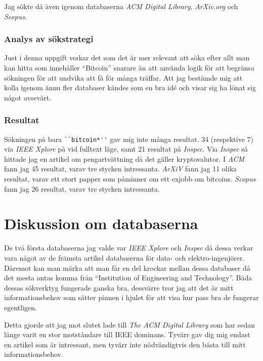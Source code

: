 \documentclass[a4paper,11pt,exjobb]{kth-mag}
\begin{document}
Jag sökte då även igenom databaserna \textit{ACM Digital Library}, \textit{ArXiv.org} och \textit{Scopus}\cite{scopus}.

\subsubsection{Analys av sökstrategi}
Just i denna uppgift verkar det som det är mer relevant att söka efter allt man kan hitta som innehåller ``Bitcoin'' snarare än att använda logik för att begränsa sökningen för att undvika att få för många träffar. Att jag bestämde mig att kolla igenom ännu fler databaser kändes som en bra idé och visar sig ha lönat sig något avsevärt.

\subsubsection{Resultat}
Sökningen på bara \verb#``bitcoin*''# gav mig inte många resultat. 34 (respektive 7) via \textit{IEEE Xplore} på vid fulltext läge, samt 21 resultat på \textit{Inspec}. 
Via \textit{Inspec} så hittade jag en artikel om pengartvättning då det gäller kryptovalutor\cite{Stokes}.
I \textit{ACM} fann jag 45 resultat, varav tre stycken intressanta\cite{Christ, Martins}.
\textit{ArXiV} fann jag 11 olika resultat, varav ett stort papper som påminner om ett exjobb om bitcoins\cite{bitsc}. 
\textit{Scopus} fann jag 26 resultat, varav tre stycken intressanta\cite{scoop1, scoop2, scoop3}.

\section{Diskussion om databaserna}
\label{sec:whydata}
De två första databaserna jag valde var \textit{IEEE Xplore} och \textit{Inspec} då dessa verkar vara något av de främsta artikel databaserna för data- och elektro-ingenjörer. Däremot kan man märka att man får en del krockar mellan dessa databaser då det mesta antas komma från ``Institution of Engineering and Technology''. Båda dessas sökverktyg fungerade ganska bra, dessvärre tror jag att det är mitt informationsbehov som sätter pinnen i hjulet för att visa hur pass bra de fungerar egentligen.

Detta gjorde att jag mot slutet lade till \textit{The ACM Digital Library} som har sedan länge varit en stor motståndare till IEEE dominans. Tyvärr gav dig mig endast en artikel som är intressant, men tyvärr inte nödvändigtvis den bästa till mitt informationsbehov. 
\end{document}
